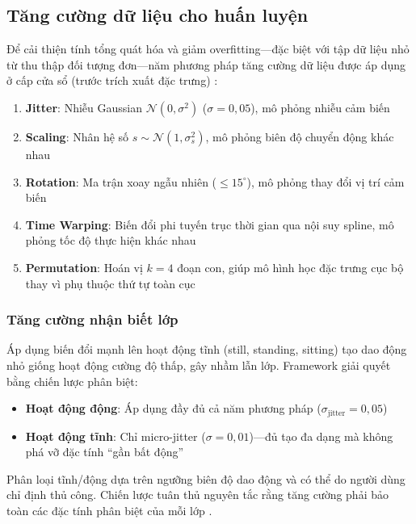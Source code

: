 \subsection{Tăng cường dữ liệu cho huấn luyện}
\label{sec:data_augmentation}

Để cải thiện tính tổng quát hóa và giảm overfitting---đặc biệt với tập dữ liệu nhỏ từ thu thập đối tượng đơn---năm phương pháp tăng cường dữ liệu được áp dụng ở cấp cửa sổ (trước trích xuất đặc trưng) \cite{um2017data, iwana2021empirical}:

\begin{enumerate}
    \item \textbf{Jitter}: Nhiễu Gaussian $\mathcal{N}(0, \sigma^2)$ ($\sigma=0{,}05$), mô phỏng nhiễu cảm biến \cite{um2017data}
    \item \textbf{Scaling}: Nhân hệ số $s \sim \mathcal{N}(1, \sigma_s^2)$, mô phỏng biên độ chuyển động khác nhau
    \item \textbf{Rotation}: Ma trận xoay ngẫu nhiên ($\leq 15^{\circ}$), mô phỏng thay đổi vị trí cảm biến \cite{eyobu2018feature}
    \item \textbf{Time Warping}: Biến đổi phi tuyến trục thời gian qua nội suy spline, mô phỏng tốc độ thực hiện khác nhau \cite{le_guennec2016augmentation}
    \item \textbf{Permutation}: Hoán vị $k=4$ đoạn con, giúp mô hình học đặc trưng cục bộ thay vì phụ thuộc thứ tự toàn cục
\end{enumerate}

\subsubsection{Tăng cường nhận biết lớp}
\label{sec:class_aware_augmentation}

Áp dụng biến đổi mạnh lên hoạt động tĩnh (still, standing, sitting) tạo dao động nhỏ giống hoạt động cường độ thấp, gây nhầm lẫn lớp. Framework giải quyết bằng chiến lược phân biệt:
\begin{itemize}
    \item \textbf{Hoạt động động}: Áp dụng đầy đủ cả năm phương pháp ($\sigma_{\text{jitter}} = 0{,}05$)
    \item \textbf{Hoạt động tĩnh}: Chỉ micro-jitter ($\sigma = 0{,}01$)---đủ tạo đa dạng mà không phá vỡ đặc tính ``gần bất động''
\end{itemize}
Phân loại tĩnh/động dựa trên ngưỡng biên độ dao động và có thể do người dùng chỉ định thủ công. Chiến lược tuân thủ nguyên tắc rằng tăng cường phải bảo toàn các đặc tính phân biệt của mỗi lớp \cite{buda2018systematic}.

